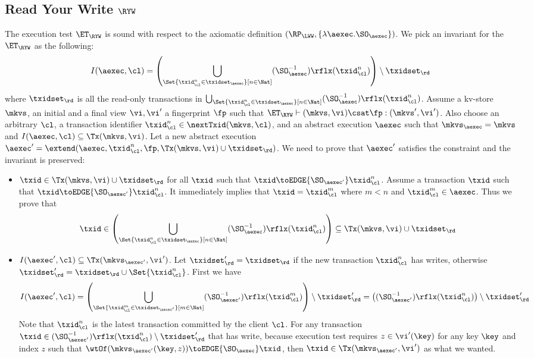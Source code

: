 \subsection{Read Your Write \( \RYW \) }

\label{sec:sound-complete-ryw}

The execution test $\ET_\RYW$ is sound with respect to the axiomatic definition 
$(\RP_{\LWW}, \{\lambda \aexec. \SO_{\aexec} \})$.
We pick an invariant for the \( \ET_\RYW \) as the following:
\[
    I(\aexec, \cl) = \left( \bigcup_{\Set{\txid_{\cl}^{n} \in \txidset_{\aexec} }[ n \in \Nat ]} (\SO_{\aexec}^{-1})\rflx(\txid^n_\cl) \right) \setminus \txidset_\rd
\]
where \( \txidset_\rd \) is all the read-only transactions in \( \bigcup_{\Set{\txid_{\cl}^{n} \in \txidset_{\aexec} }[ n \in \Nat ]} (\SO_{\aexec}^{-1})\rflx(\txid^n_\cl) \).
Assume a kv-store $\mkvs$, an initial and a final view $\vi, \vi'$  a fingerprint $\fp$ 
such that $\ET_{\RYW} \vdash (\mkvs, \vi) \csat \fp: (\mkvs',\vi')$. 
Also choose an arbitrary $\cl$, a transaction identifier $\txid_\cl^n \in \nextTxid(\mkvs, \cl)$, 
and an abstract execution $\aexec$ such that $\mkvs_{\aexec} = \mkvs$ and 
\( I(\aexec, \cl) \subseteq \Tx(\mkvs, \vi) \).
Let a new abstract execution \( \aexec' = \extend(\aexec, \txid_\cl^n, \fp, \Tx(\mkvs, \vi) \cup \txidset_\rd) \).
We need to prove that \( \aexec' \) satisfies the constraint and the invariant is preserved:
\begin{itemize}
    \item \( \txid \in \Tx(\mkvs, \vi) \cup \txidset_\rd  \) for all \( \txid \) such that \( \txid \toEDGE{\SO_{\aexec'}} \txid_\cl^n  \). 
    Assume a transaction \( \txid \) such that \( \txid \toEDGE{\SO_{\aexec'}} \txid_\cl^n \).
It immediately implies that \( \txid = \txid_\cl^m\) where \( m < n \) and \( \txid_\cl^m \in \aexec \).
Thus we prove that 
\[ 
    \txid \in \left( \bigcup_{\Set{\txid_{\cl}^{n} \in \txidset_{\aexec} }[ n \in \Nat]} (\SO_{\aexec}^{-1})\rflx(\txid^n_\cl) \right) \subseteq \Tx(\mkvs,\vi) \cup \txidset_\rd
\]
\item \(I(\aexec',\cl) \subseteq \Tx(\mkvs_{\aexec'}, \vi') \).
Let \( \txidset'_\rd = \txidset_\rd \) if the new transaction \( \txid_\cl^n\) has writes, otherwise \( \txidset'_\rd = \txidset_\rd \cup \Set{\txid_\cl^n}\).
First we have
\[ I(\aexec', \cl) = \left(\bigcup_{\Set{\txid_{\cl}^{m} \in \txidset_{\aexec'} }[ m \in \Nat ]} (\SO_{\aexec'}^{-1})\rflx(\txid^m_\cl) \right) \setminus \txidset'_{\rd} = \left( (\SO_{\aexec'}^{-1})\rflx(\txid^n_\cl) \right) \setminus \txidset'_\rd 
\]
Note that \( \txid^n_\cl \) is the latest transaction committed by the client \( \cl \).
For any transaction \( \txid \in (\SO_{\aexec'}^{-1})\rflx(\txid^n_\cl) \setminus \txidset'_\rd \) that has write,
because execution test requires \( z \in \vi'(\key) \) for any key \( \key \) and index \( z \) such that \( \wtOf( \mkvs_{\aexec'}(\key, z) ) \toEDGE{\SO_\aexec} \txid \),
then \( \txid \in \Tx(\mkvs_{\aexec'}, \vi') \) as what we wanted.
\end{itemize}

